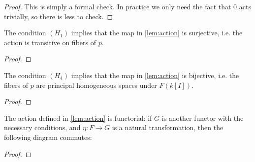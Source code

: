\begin{proof}
  \leanok
  This is simply a formal check. In practice we only need
  the fact that $0$ acts trivially, so there is less to check.
\end{proof}

\begin{lemma}
  \label{lem:actionH1}
  \leanok
  The condition $(H_1)$ implies that the map in \cref{lem:action}
  is surjective, i.e.
  the action is transitive on fibers of $p$.
\end{lemma}

\begin{proof}
  \leanok
\end{proof}

\begin{lemma}
  \label{lem:actionH4}
  \leanok
  The condition $(H_4)$ implies that the map in \cref{lem:action}
  is bijective, i.e.
  the fibers of $p$ are principal homogeneous spaces under $F(k[I])$.
\end{lemma}

\begin{proof}
  \leanok
\end{proof}

\begin{lemma}
  \label{lem:actionnattrans}
  \leanok
  The action defined in \cref{lem:action} is functorial:
  if $G$ is another functor with the necessary conditions,
  and $\eta : F \to G$
  is a natural transformation, then the following diagram commutes:

\begin{center}
\end{center}
\end{lemma}

\begin{proof}
  \leanok
\end{proof}

